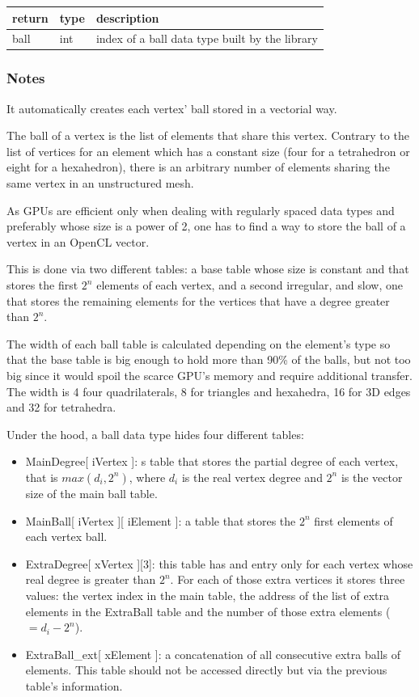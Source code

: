 \documentclass[a4paper,12pt]{article}
\begin{document}
\medskip

\begin{tabular}{|m{2cm}|m{1.5cm}|m{10.5cm}|}
\hline
return     & type   & description \\
\hline
ball       & int    & index of a ball data type built by the library \\
\hline
\end{tabular}
\subsubsection*{Notes}

It automatically creates each vertex' ball stored in a vectorial way.

The ball of a vertex is the list of elements that share this vertex. Contrary to the list of vertices for an element which has a constant size (four for a tetrahedron or eight for a hexahedron), there is an arbitrary number of elements sharing the same vertex in an unstructured mesh.

As GPUs are efficient only when dealing with regularly spaced data types and preferably whose size is a power of 2, one has to find a way to store the ball of a vertex in an OpenCL vector.

This is done via two different tables: a base table whose size is constant and that stores the first $2^n$ elements of each vertex, and a second irregular, and slow, one that stores the remaining elements for the vertices that have a degree greater than $2^n$.

The width of each ball table is calculated depending on the element's type so that the base table is big enough to hold more than 90\% of the balls, but not too big since it would spoil the scarce GPU's memory and require additional transfer. The width is 4 four quadrilaterals, 8 for triangles and hexahedra, 16 for 3D edges and 32 for tetrahedra.

\medskip

Under the hood, a ball data type hides four different tables:

\begin{itemize}
\item  MainDegree[ iVertex ]: s table that stores the partial degree of each vertex, that is $max(d_i, 2^n)$, where $d_i$ is the real vertex degree and $2^n$ is the vector size of the main ball table.
\item MainBall[ iVertex ][ iElement ]: a table that stores the $2^n$ first elements of each vertex ball.
\item ExtraDegree[ xVertex ][3]: this table has and entry only for each vertex whose real degree is greater than $2^n$. For each of those extra vertices it stores three values: the vertex index in the main table, the address of the list of extra elements in the ExtraBall table and the number of those extra elements ($ = d_i - 2^n$).
\item ExtraBall\_ext[ xElement ]: a concatenation of all consecutive extra balls of elements. This table should not be accessed directly but via the previous table's information.
\end{itemize}
\end{document}
